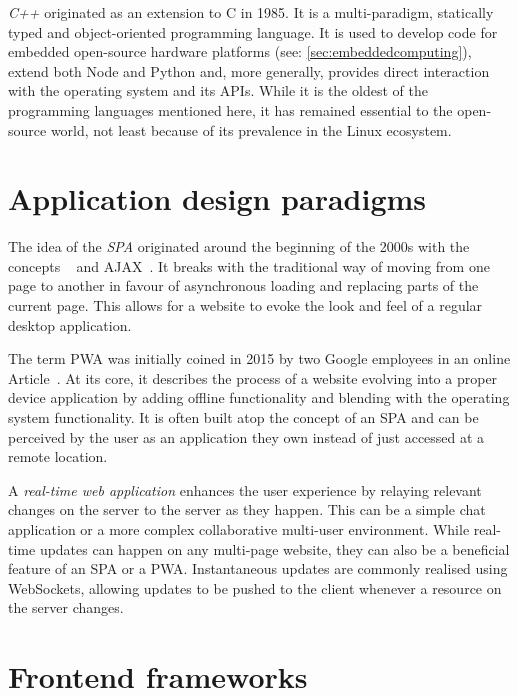\emph{C++} originated as an extension to C in 1985.
It is a multi-paradigm, statically typed and object-oriented programming language.
It is used to develop code for embedded open-source hardware platforms (see: \autoref{sec:embeddedcomputing}), extend both Node and Python and, more generally, provides direct interaction with the operating system and its APIs.
While it is the oldest of the programming languages mentioned here, it has remained essential to the open-source world, not least because of its prevalence in the Linux ecosystem.

\section{Application design paradigms}
\label{sec:application-design-paradigms}

The idea of the \emph{\ac{SPA}} originated around the beginning of the 2000s with the concepts ~\parencite{innerBrowsing} and \ac{AJAX}~\parencite{ajaxNewApproach}.
It breaks with the traditional way of moving from one page to another in favour of asynchronous loading and replacing parts of the current page.
This allows for a website to evoke the look and feel of a regular desktop application.

The term \ac{PWA} was initially coined in 2015 by two Google employees in an online Article~\parencite{progressiveWebApplications}.
At its core, it describes the process of a website  evolving into a proper device application by adding offline functionality and blending with the operating system functionality.
It is often built atop the concept of an \ac{SPA} and can be perceived by the user as an application they own instead of just accessed at a remote location.

A \emph{real-time web application} enhances the user experience by relaying relevant changes on the server to the server as they happen.
This can be a simple chat application or a more complex collaborative multi-user environment.
While real-time updates can happen on any multi-page website, they can also be a beneficial feature of an \ac{SPA} or a \ac{PWA}.
Instantaneous updates are commonly realised using WebSockets, allowing updates to be pushed to the client whenever a resource on the server changes.


\section{Frontend frameworks}
\label{sec:frontend-frameworks}


